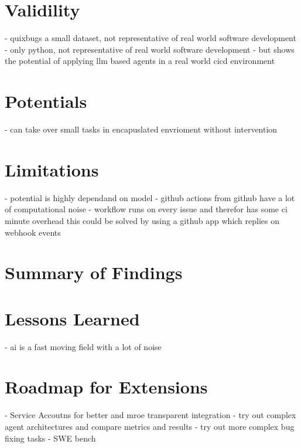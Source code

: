 \section{Validility}
- quixbugs a small dataset, not representative of real world software development
- only python, not representative of real world software development
- but shows the potential of applying llm based agents in a real world cicd environment

\section{Potentials}
- can take over small tasks in encapuslated envrioment without intervention

\section{Limitations}
- potential is highly dependand on model
- github actions from github have a lot of computational noise
- workflow runs on every issue and therefor has some ci minute overhead this could be solved by using a github app which replies on webhook events

\section{Summary of Findings}
\section{Lessons Learned}
- ai is a fast moving field with a lot of noise


\section{Roadmap for Extensions}
- Service Accoutns for better and mroe transparent integration
- try out complex agent architectures and compare metrics and results
- try out more complex bug fixing tasks - SWE bench